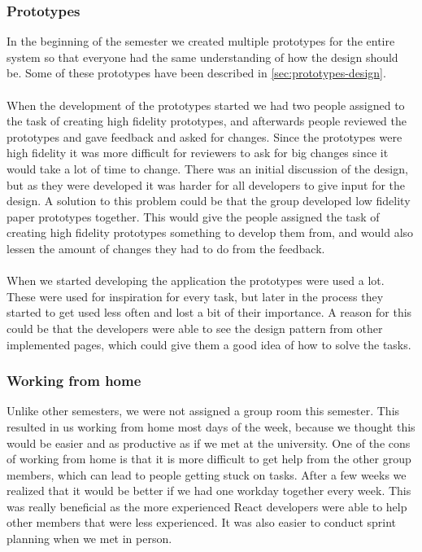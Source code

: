 \subsubsection{Prototypes}
In the beginning of the semester we created multiple prototypes for the entire system so that everyone had the same understanding of how the design should be.
Some of these prototypes have been described in \autoref{sec:prototypes-design}.
\\\\
When the development of the prototypes started we had two people assigned to the task of creating high fidelity prototypes, and afterwards people reviewed the prototypes and gave feedback and asked for changes.
Since the prototypes were high fidelity it was more difficult for reviewers to ask for big changes since it would take a lot of time to change.
There was an initial discussion of the design, but as they were developed it was harder for all developers to give input for the design.
A solution to this problem could be that the group developed low fidelity paper prototypes together. 
This would give the people assigned the task of creating high fidelity prototypes something to develop them from, and would also lessen the amount of changes they had to do from the feedback.
\\\\
When we started developing the application the prototypes were used a lot.
These were used for inspiration for every task, but later in the process they started to get used less often and lost a bit of their importance.
A reason for this could be that the developers were able to see the design pattern from other implemented pages, which could give them a good idea of how to solve the tasks.

\subsubsection{Working from home}
Unlike other semesters, we were not assigned a group room this semester.
This resulted in us working from home most days of the week, because we thought this would be easier and as productive as if we met at the university.
One of the cons of working from home is that it is more difficult to get help from the other group members, which can lead to people getting stuck on tasks.
After a few weeks we realized that it would be better if we had one workday together every week.
This was really beneficial as the more experienced React developers were able to help other members that were less experienced.
It was also easier to conduct sprint planning when we met in person.

